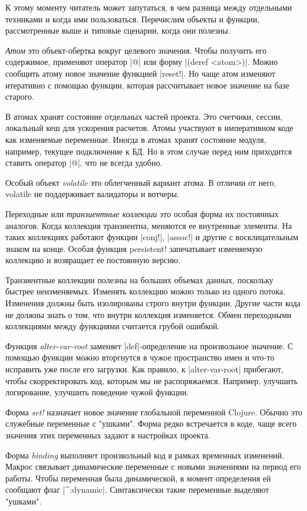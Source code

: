 {{{{{{{{К этому моменту читатель может запутаться, в чем разница между отдельными
техниками и когда ими пользоваться. Перечислим объекты и функции, рассмотренные
выше и типовые сценарии, когда они полезны.

\emph{Атом} это объект-обертка вокруг целевого значения. Чтобы получить его
содержимое, применяют оператор \spverb|@| или форму \spverb|(deref <atom>)|. Можно сообщить
атому новое значение функцией \spverb|reset!|. Но чаще атом изменяют итеративно с
помощью функции, которая рассчитывает новое значение на базе старого.

В атомах хранят состояние отдельных частей проекта. Это счетчики, сессии,
локальный кеш для ускорения расчетов. Атомы участвуют в императивном коде как
изменяемые переменные. Иногда в атомах хранят состояние модуля, например,
текущее подключение к БД. Но в этом случае перед ним приходится ставить оператор
\spverb|@|, что не всегда удобно.

Особый объект \emph{volatile} это облегченный вариант атома. В отличии от него,
volatile не поддерживает валидаторы и вотчеры.

Переходные или \emph{транзиентные коллекции} это особая форма их постоянных
аналогов. Когда коллекция транзиентна, меняются ее внутренные элементы. На таких
коллекциях работают функции \spverb|conj!|, \spverb|assoc!| и другие с восклицательным знаком
на конце. Особая функция persistent! запечатывает изменяемую коллекцию и
возвращает ее постоянную версию.

Транзиентные коллекции полезны на больших объемах данных, поскольку быстрее
неизменяемых. Изменять коллекцию можно только из одного потока. Изменения должны
быть изолированы строго внутри функции. Другие части кода не должны знать о том,
что внутри коллекция изменяется. Обмен переходными коллекциями между функциями
считается грубой ошибкой.

Функция \emph{alter-var-root} заменяет \spverb|def|-определение на произвольное значение. С
помощью функции можно вторгнутся в чужое пространство имен и что-то исправить
уже после его загрузки. Как правило, к \spverb|alter-var-root| прибегают, чтобы
скорректировать код, которым мы не распоряжаемся. Например, улучшить
логирование, улучшить поведение чужой функции.

Форма \emph{set!} назначает новое значение глобальной переменной Clojure. Обычно
это служебные переменные с "ушками". Форма редко встречается в коде, чаще всего
значения этих переменных задают в настройках проекта.

Форма \emph{binding} выполняет произвольный код в рамках временных
изменений. Макрос связывает динамические переменные с новыми значениями на
период его работы. Чтобы переменная была динамической, в момент определения ей
сообщают флаг \spverb|^:dynamic|. Синтаксически такие переменные выделяют "ушками".

}}}}}}}}

